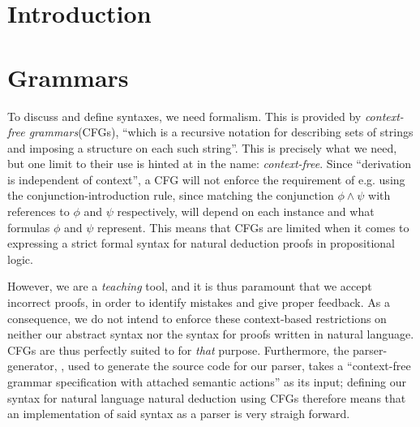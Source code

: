 \documentclass[a4paper]{article}
\title{\tit}
\begin{document}
\begin{titlepage}
\maketitle
\thispagestyle{empty}
\end{titlepage}

\fancyfoot[]{}



\pagebreak
\setcounter{tocdepth}{2}
\tableofcontents
\pagebreak
\lstlistoflistings
\pagebreak
\listoffigures
\clearpage
{}

\section{Introduction} %

\clearpage

\section{Grammars}\label{grams}
To discuss and define syntaxes, we need formalism. This is provided by 
 \emph{context-free grammars}(CFGs), ``which is a recursive notation
 for describing sets of strings and imposing a structure on each such
 string''\cite[p.~39]{compilers}. This is precisely what we need, but one
 limit to their use is hinted at in the name: \emph{context-free}. Since
 ``derivation is independent of context'', a CFG  will not
 enforce the requirement of e.g. using the conjunction-introduction rule,
 since matching the conjunction \(\phi \land \psi\) with references to
 \(\phi\) and \(\psi\) respectively, will depend on each instance and
 what formulas \(\phi\) and \(\psi\) represent. This means that CFGs are
 limited when it comes to expressing a strict formal syntax for natural
 deduction proofs in propositional logic.

 However, we are  a \emph{teaching} tool, and it is thus
 paramount that we accept incorrect proofs, in order to identify mistakes
 and give proper feedback. As a consequence, we do not intend to enforce
 these context-based restrictions on neither our abstract syntax nor
 the syntax for proofs written in natural language. CFGs are thus perfectly
 suited to  for \emph{that} purpose. Furthermore, the
 parser-generator, \yac , used to generate the source code for our parser,
 takes a ``context-free grammar specification with attached semantic
 actions''\cite[p.~44]{mosman} as its input; defining our syntax for natural language
 natural deduction using CFGs therefore means that an implementation of
 said syntax as a parser is very straigh forward.
\end{document}
